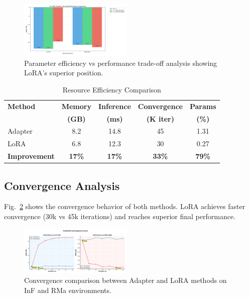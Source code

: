 \documentclass[conference]{IEEEtran}
\begin{document}
\begin{figure}[t]
\centering
\includegraphics[width=0.48\textwidth]{figures/efficiency_scatter.pdf}
\caption{Parameter efficiency vs performance trade-off analysis showing LoRA's superior position.}
\label{fig:efficiency}
\end{figure}

\begin{table}[t]
\centering
\caption{Resource Efficiency Comparison}
\label{tab:efficiency}
\begin{tabular}{lcccc}
\toprule
\textbf{Method} & \textbf{Memory} & \textbf{Inference} & \textbf{Convergence} & \textbf{Params} \\
 & \textbf{(GB)} & \textbf{(ms)} & \textbf{(K iter)} & \textbf{(\%)} \\
\midrule
Adapter & 8.2 & 14.8 & 45 & 1.31 \\
LoRA & 6.8 & 12.3 & 30 & 0.27 \\
\midrule
\textbf{Improvement} & \textbf{17\%} & \textbf{17\%} & \textbf{33\%} & \textbf{79\%} \\
\bottomrule
\end{tabular}
\end{table}

\subsection{Convergence Analysis}

Fig.~\ref{fig:convergence} shows the convergence behavior of both methods. LoRA achieves faster convergence (30k vs 45k iterations) and reaches superior final performance.

\begin{figure}[t]
\centering
\includegraphics[width=0.48\textwidth]{figures/convergence_analysis.pdf}
\caption{Convergence comparison between Adapter and LoRA methods on InF and RMa environments.}
\label{fig:convergence}
\end{figure}
\end{document}
